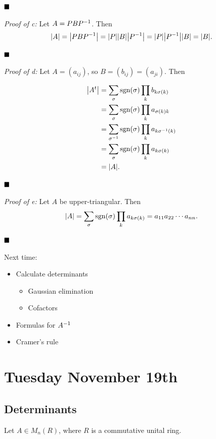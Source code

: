 \(\qed\)

\emph{Proof of c:} Let \(A = PBP^{-1}\). Then \[
{\left\lvert {A} \right\rvert} = {\left\lvert {PBP^{-1}} \right\rvert} = {\left\lvert {P} \right\rvert} {\left\lvert {B} \right\rvert} {\left\lvert {P^{-1}} \right\rvert} = {\left\lvert {P} \right\rvert} {\left\lvert {P^{-1}} \right\rvert} {\left\lvert {B} \right\rvert} = {\left\lvert {B} \right\rvert}
.\]

\(\qed\)

\emph{Proof of d:} Let \(A = (a_{ij})\), so \(B = (b_{ij}) = (a_{ji})\).
Then

\begin{align*}
{\left\lvert {A^t} \right\rvert}
&= \sum_{\sigma} \mathrm{sgn}(\sigma) \prod_k b_{k \sigma(k)} \\
&= \sum_\sigma \mathrm{sgn}(\sigma) \prod_k a_{\sigma(k) k} \\
&= \sum_{\sigma^{-1}} \mathrm{sgn}(\sigma) \prod_k a_{k \sigma^{-1}(k)} \\
&= \sum_\sigma \mathrm{sgn}(\sigma) \prod_k a_{k \sigma(k)} \\
&= {\left\lvert {A} \right\rvert}
.\end{align*}

\(\qed\)

\emph{Proof of e:} Let \(A\) be upper-triangular. Then \[
{\left\lvert {A} \right\rvert} = \sum_\sigma \mathrm{sgn}(\sigma) \prod_k a_{k \sigma(k)} = a_{11} a_{22} \cdots a_{nn}
.\]

\(\qed\)

Next time:

\begin{itemize}
\tightlist
\item
  Calculate determinants

  \begin{itemize}
  \tightlist
  \item
    Gaussian elimination
  \item
    Cofactors
  \end{itemize}
\item
  Formulas for \(A^{-1}\)
\item
  Cramer's rule
\end{itemize}

\hypertarget{tuesday-november-19th}{%
\section{Tuesday November 19th}\label{tuesday-november-19th}}

\hypertarget{determinants}{%
\subsection{Determinants}\label{determinants}}

Let \(A\in M_n(R)\), where \(R\) is a commutative unital ring.

